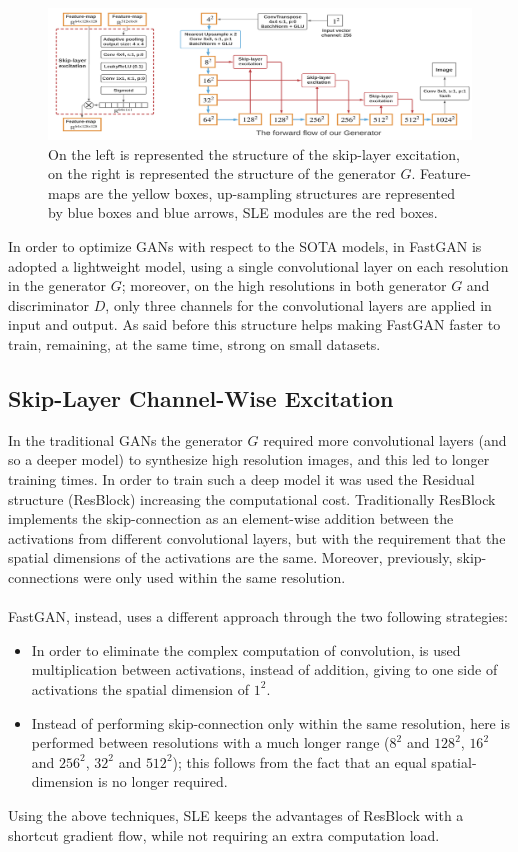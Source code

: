 \documentclass[12pt]{article}
\begin{document}
\begin{figure}[H]
	\includegraphics[width=1\textwidth]{Images/structure.png}
	\caption{
		On the left is represented the structure of the skip-layer excitation,
		on the right is represented the structure of the generator $G$. 
		Feature-maps are the yellow boxes, up-sampling structures are represented 
		by blue boxes and blue arrows, SLE modules are the red boxes.
		}
\end{figure}
In order to optimize GANs with respect to the SOTA models, in FastGAN is adopted a lightweight model, 
using a single convolutional layer on each resolution in the generator $G$; moreover, on the high resolutions
in both generator $G$ and discriminator $D$, only three channels for the convolutional layers are applied in 
input and output. As said before this structure helps making FastGAN faster to train, remaining, at the same time,
strong on small datasets. 

\subsection{Skip-Layer Channel-Wise Excitation}

In the traditional GANs the generator $G$ required more convolutional layers (and so a deeper model) to synthesize 
high resolution images, and this led to longer training times. 
In order to train such a deep model it was used the Residual structure (ResBlock) increasing the computational cost.
Traditionally ResBlock implements the skip-connection as an element-wise addition between the activations from different
convolutional layers, but with the requirement that the spatial dimensions of the activations are the same.
Moreover, previously, skip-connections were only used within the same resolution.\\\\
FastGAN, instead, uses a different approach through the two following strategies:
\begin{itemize}
	\setlength\itemsep{0.01em}
	\item {	
	In order to eliminate the complex computation of convolution, is used multiplication between activations, instead of 
	addition, giving to one side of activations the spatial dimension of $1^2$.
	}
	\item {
	Instead of performing skip-connection only within the same resolution, here is performed between resolutions with a much
	longer range ($8^2$ and $128^2$, $16^2$ and $256^2$, $32^2$ and $512^2$); this follows from the fact that an equal spatial-dimension
	is no longer required.
	}
\end{itemize} 
Using the above techniques, SLE keeps the advantages of ResBlock with a shortcut gradient flow, while not requiring an extra computation
load.
\end{document}
